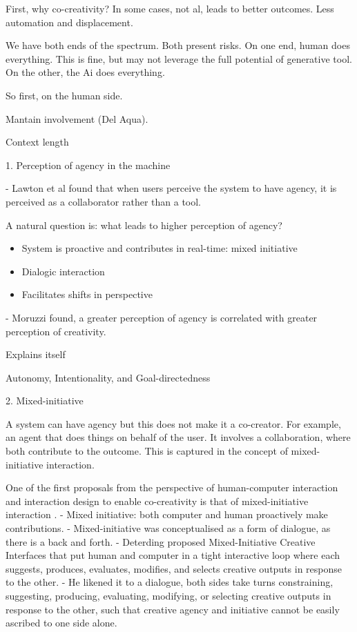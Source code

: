 \cite{Jia2024-vp}


First, why co-creativity? 
In some cases, not al, leads to better outcomes. 
Less automation and displacement. 

We have both ends of the spectrum. Both present risks. 
On one end, human does everything. This is fine, but may not leverage the full potential of generative tool. 
On the other, the Ai does everything. 

So first, on the human side. 

Mantain involvement (Del Aqua).

Context length



1. Perception of agency in the machine 

- Lawton et al \cite{Lawton2023-tb} found that when users perceive the system to have agency, it is perceived as a collaborator rather than a tool.

A natural question is: what leads to higher perception of agency? 

\begin{itemize}
  \item System is proactive and contributes in real-time: mixed initiative \cite{Lawton2023-tb}
  \item Dialogic interaction \cite{Lawton2023-tb}
  \item Facilitates shifts in perspective \cite{Lawton2023-tb}

\end{itemize}

- Moruzzi \cite{Moruzzi2022-gp} found, a greater perception of agency is correlated with greater perception of creativity. 
  \item Explains itself \cite{Moruzzi2022-gp}
  \item Autonomy, Intentionality, and Goal-directedness \cite{Moruzzi2022-gp}

2. Mixed-initiative

A system can have agency but this does not make it a co-creator. For example, an agent that does things on behalf of the user. 
It involves a collaboration, where both contribute to the outcome. This is captured in the concept of mixed-initiative interaction.

One of the first proposals from the perspective of human-computer interaction and interaction design to enable co-creativity is that of mixed-initiative interaction \cite{Allen1999-sr, Horvitz1999-wh Yannakakis2014-zs, Liapis2016-zt, Zhu2018-zd}. 
- Mixed initiative: both computer and human proactively make contributions. 
- Mixed-initiative was conceptualised as a form of dialogue, as there is a back and forth. 
- Deterding \cite{Deterding2017-wh} proposed Mixed-Initiative Creative Interfaces that put human and computer in a tight interactive loop where each suggests, produces, evaluates, modifies, and selects creative outputs in response to the other. 
- He likened it to a dialogue, both sides take turns constraining, suggesting, producing, evaluating, modifying, or selecting creative outputs in response to the other, such that creative agency and initiative cannot be easily ascribed to one side alone. 

